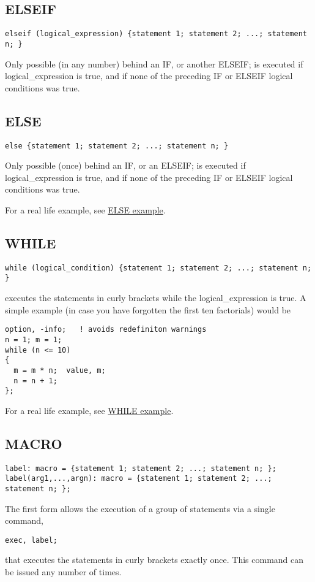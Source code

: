 \subsection{ELSEIF}
\begin{verbatim}
elseif (logical_expression) {statement 1; statement 2; ...; statement n; }
\end{verbatim} 
Only possible (in any number) behind an IF, or another ELSEIF; is
executed if  logical\_expression is true, and if none of the preceding
IF or ELSEIF logical conditions was true.  


\subsection{ELSE}
\begin{verbatim}
else {statement 1; statement 2; ...; statement n; }
\end{verbatim} 
Only possible (once) behind an IF, or an ELSEIF; is executed if
logical\_expression is true, and if none of the preceding IF or ELSEIF
logical conditions was true.  

For a real life example, see \href{foot.html}{ELSE example}. 


\subsection{WHILE}
\begin{verbatim}
while (logical_condition) {statement 1; statement 2; ...; statement n; }
\end{verbatim}  
executes the statements in curly brackets while the logical\_expression
is true. A simple example (in case you have forgotten the first ten
factorials) would be  
\begin{verbatim}
option, -info;   ! avoids redefiniton warnings
n = 1; m = 1;
while (n <= 10)
{
  m = m * n;  value, m;
  n = n + 1;
};
\end{verbatim}

For a real life example, see \href{foot.html}{WHILE example}.

\subsection{MACRO}
\label{subsec:special_macro}
\begin{verbatim}
label: macro = {statement 1; statement 2; ...; statement n; };
label(arg1,...,argn): macro = {statement 1; statement 2; ...; statement n; };
\end{verbatim} 
The first form allows the execution of a group of statements via a
single command,  
\begin{verbatim}
exec, label;
\end{verbatim} 
that executes the statements in curly brackets exactly once. This command
can be issued any number of times.  

